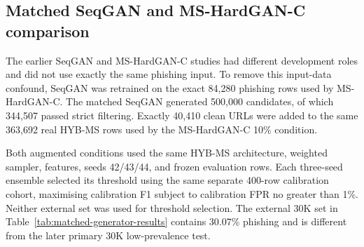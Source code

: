 \subsection{Matched SeqGAN and MS-HardGAN-C comparison}
\label{sec:matched-generator-comparison}

The earlier SeqGAN and MS-HardGAN-C studies had different development roles
and did not use exactly the same phishing input. To remove this input-data
confound, SeqGAN was retrained on the exact 84,280 phishing rows used by
MS-HardGAN-C. The matched SeqGAN generated 500,000 candidates, of which
344,507 passed strict filtering. Exactly 40,410 clean URLs were added to the
same 363,692 real HYB-MS rows used by the MS-HardGAN-C 10\% condition.

Both augmented conditions used the same HYB-MS architecture, weighted sampler,
features, seeds 42/43/44, and frozen evaluation rows. Each three-seed ensemble
selected its threshold using the same separate 400-row calibration cohort,
maximising calibration F1 subject to calibration FPR no greater than 1\%.
Neither external set was used for threshold selection. The external 30K set in
Table~\ref{tab:matched-generator-results} contains 30.07\% phishing and is
different from the later primary 30K low-prevalence test.

\begin{table}[htbp]
\centering
\caption{Matched-input generator comparison using the same HYB-MS procedure (\%).}
\label{tab:matched-generator-results}
\scriptsize
{}
\end{table}


